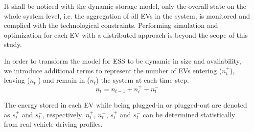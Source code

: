 It shall be noticed with the dynamic storage model, only the overall state on the whole system level, i.e. the aggregation of all EVs in the system, is monitored and complied with the technological constraints. Performing simulation and optimization for each EV with a distributed approach is beyond the scope of this study. 

In order to transform the model for ESS to be dynamic in size and availability, we introduce additional terms to represent the number of EVs entering ($n_t^+$), leaving ($n_t^-$) and remain in ($n_t$) the system at each time step.
\begin{equation}
\label{eq:EV-number}
n_t = n_{t-1} + n_t^+ - n_t^-
\end{equation}

The energy stored in each EV while being plugged-in or plugged-out are denoted as $s_t^+$ and $s_t^-$, respectively. $n_t^+$, $n_t^-$, $s_t^+$ and $s_t^-$ can be determined statistically from real vehicle driving profiles. 

